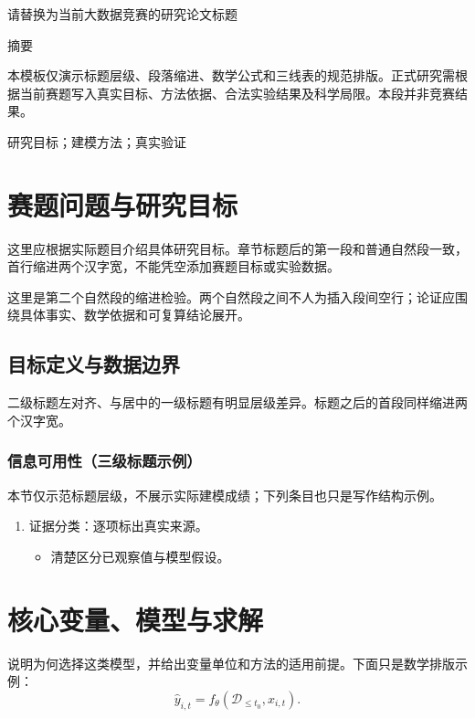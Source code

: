 \documentclass[UTF8,zihao=-4,a4paper]{ctexart}
\begin{document}
\thispagestyle{empty}
\begin{center}
{\heiti{} 请替换为当前大数据竞赛的研究论文标题\par}
\vspace{1.35em}
{\heiti{} 摘\quad 要\par}
\end{center}
\vspace{0.35em}
本模板仅演示标题层级、段落缩进、数学公式和三线表的规范排版。正式研究需根据当前赛题写入真实目标、方法依据、合法实验结果及科学局限。本段并非竞赛结果。

\vspace{0.9em}
 研究目标；建模方法；真实验证
\clearpage
\thispagestyle{empty}
\begingroup
\setlength{\parindent}{0pt}
\tableofcontents
\endgroup
\clearpage
\setcounter{page}{1}
\hypersetup{pageanchor=true}
\section{赛题问题与研究目标}
这里应根据实际题目介绍具体研究目标。章节标题后的第一段和普通自然段一致，首行缩进两个汉字宽，不能凭空添加赛题目标或实验数据。

这里是第二个自然段的缩进检验。两个自然段之间不人为插入段间空行；论证应围绕具体事实、数学依据和可复算结论展开。

\subsection{目标定义与数据边界}
二级标题左对齐、与居中的一级标题有明显层级差异。标题之后的首段同样缩进两个汉字宽。

\subsubsection{信息可用性（三级标题示例）}
本节仅示范标题层级，不展示实际建模成绩；下列条目也只是写作结构示例。

\begin{enumerate}
\item 证据分类：逐项标出真实来源。
  \begin{itemize}
  \item 清楚区分已观察值与模型假设。
  \end{itemize}
\end{enumerate}

\section{核心变量、模型与求解}
说明为何选择这类模型，并给出变量单位和方法的适用前提。下面只是数学排版示例：
\begin{equation}
\widehat y_{i,t}=f_{\theta}(\mathcal{D}_{\le t_0},x_{i,t}).
\end{equation}
\end{document}

